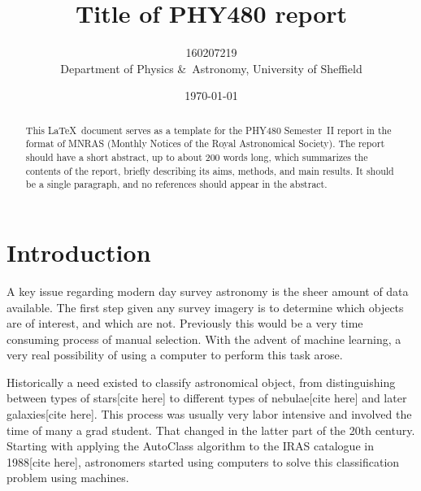 \documentclass[a4paper,fleqn,usenatbib]{mnras}
\title[PHY480 Project]{Title of PHY480 report}
\author[160207219]{160207219
\\
Department of Physics \&\ Astronomy, University of Sheffield}
\date{\today}
\begin{document}
\label{firstpage}
\pagerange{\pageref{firstpage}--\pageref{lastpage}}
\maketitle

\begin{abstract}
This  \LaTeX\ document serves as a template for the PHY480 Semester~II report in the format of MNRAS (Monthly Notices of the Royal Astronomical Society). The report should have a short abstract, up to about 200 words long, which summarizes the contents of the report, briefly describing its aims, methods, and main results.
It should be a single paragraph, and no references should appear in the abstract.
\end{abstract}







\section{Introduction}
\label{sec:introduction}

A key issue regarding modern day survey astronomy is the sheer amount of data available. The first step given any survey imagery is to determine which objects are of interest, and which are not. Previously this would be a very time consuming process of manual selection. With the advent of machine learning, a very real possibility of using a computer to perform this task arose. 

Historically a need existed to classify astronomical object, from distinguishing between types of stars[cite here] to different types of nebulae[cite here] and later galaxies[cite here]. This process was usually very labor intensive and involved the time of many a grad student. That changed in the latter part of the 20th century. Starting with applying the AutoClass algorithm to the IRAS catalogue in 1988[cite here], astronomers started using computers to solve this classification problem using machines.
\end{document}
